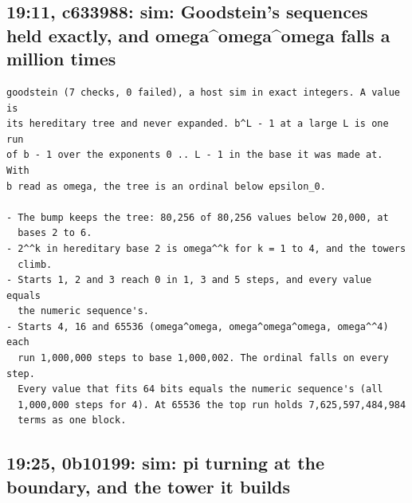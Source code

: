 \subsection{\texorpdfstring{19:11, c633988: sim: Goodstein's sequences held exactly, and omega\textasciicircum{}omega\textasciicircum{}omega falls a million times}{19:11, c633988: sim: Goodstein's sequences held exactly, and omega\textasciicircum{}omega\textasciicircum{}omega falls a million times}}

\begin{Verbatim}
goodstein (7 checks, 0 failed), a host sim in exact integers. A value is
its hereditary tree and never expanded. b^L - 1 at a large L is one run
of b - 1 over the exponents 0 .. L - 1 in the base it was made at. With
b read as omega, the tree is an ordinal below epsilon_0.

- The bump keeps the tree: 80,256 of 80,256 values below 20,000, at
  bases 2 to 6.
- 2^^k in hereditary base 2 is omega^^k for k = 1 to 4, and the towers
  climb.
- Starts 1, 2 and 3 reach 0 in 1, 3 and 5 steps, and every value equals
  the numeric sequence's.
- Starts 4, 16 and 65536 (omega^omega, omega^omega^omega, omega^^4) each
  run 1,000,000 steps to base 1,000,002. The ordinal falls on every step.
  Every value that fits 64 bits equals the numeric sequence's (all
  1,000,000 steps for 4). At 65536 the top run holds 7,625,597,484,984
  terms as one block.
\end{Verbatim}

\subsection{\texorpdfstring{19:25, 0b10199: sim: pi turning at the boundary, and the tower it builds}{19:25, 0b10199: sim: pi turning at the boundary, and the tower it builds}}

